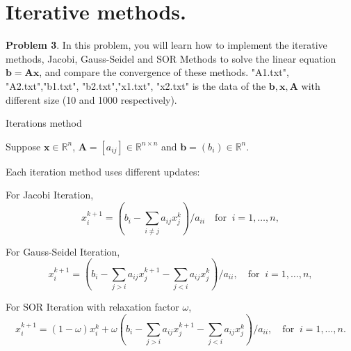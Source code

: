 \documentclass[english,onecolumn]{IEEEtran}
\begin{document}
\clearpage
\newpage
\section{Iterative methods.}
\noindent\textbf{Problem 3}.
In this problem, you will learn how to implement the iterative methods, Jacobi, Gauss-Seidel and SOR Methods to solve the linear equation $\mathbf{b}=\mathbf{Ax}$, and compare the convergence of these methods. 
"A1.txt", "A2.txt","b1.txt", "b2.txt","x1.txt", "x2.txt" is the data of the $\mathbf{b}, \mathbf{x}, \mathbf{A}$ with different size (10 and 1000 respectively).
\begin{algorithm}
	\caption{Iterations method}
	\label{algo:Jacobi}
    \LinesNumbered
\end{algorithm}

Suppose $\mathbf{x}\in\mathbb{R}^{n}$, $\mathbf{A}=[a_{ij}]\in\mathbb{R}^{n\times n}$ and $\mathbf{b}=(b_i)\in\mathbb{R}^{n}$.

Each iteration method uses different updates:

For Jacobi Iteration, 
\begin{equation*}
    x_i^{k+1} = (b_i - \sum_{i \neq j} a_{ij}x_j^k) / a_{ii} \quad \text{for }\ i = 1,\dots, n,
\end{equation*}

For Gauss-Seidel Iteration, 
\begin{equation*}
    x_i^{k+1} = (b_i - \sum_{j > i} a_{ij}x_j^{k+1} - \sum_{j < i} a_{ij}x_j^{k}) / a_{ii}, \quad \text{for }\ i = 1,\dots, n,
\end{equation*}

For SOR Iteration with relaxation factor $\omega$, 
\begin{equation*}
    x_i^{k+1} = (1-\omega) x_i^{k} + \omega \left(b_i - \sum_{j>i} a_{ij}x_j^{k+1} - \sum_{j<i} a_{ij}x_j^{k}\right) / a_{ii}, \quad \text{for }\ i = 1,\dots, n.
\end{equation*}
\end{document}
